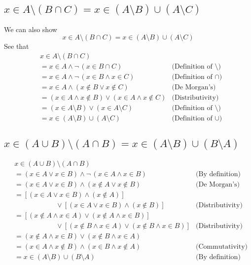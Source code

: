 \documentclass{report}
\begin{document}
\subsection{$x\in A\setminus(B\cap C)=x\in(A\setminus B)\cup(A\setminus C)$}
We can also show
\begin{equation*}
x\in A\setminus(B\cap C)=x\in(A\setminus B)\cup(A\setminus C)
\end{equation*}
See that
\begin{align*}
&x\in A\setminus(B\cap C)&\\
&=x\in A\land\neg\,(x\in B\cap C)&\text{(Definition of $\setminus$)}\\
&=x\in A\land\neg\,(x\in B\land x\in C)&\text{(Definition of $\cap$)}\\
&=x\in A\land(x\notin B\lor x\notin C)&\text{(De Morgan's)}\\
&=(x\in A\land x\notin B)\lor(x\in A\land x\notin C)&\text{(Distributivity)}\\
&=(x\in A\setminus B)\lor(x\in A\setminus C)&\text{(Definition of $\setminus$)}\\
&=x\in(A\setminus B)\cup(A\setminus C)&\text{(Definition of $\cup$)}
\end{align*}

\subsection{$x\in(A\cup B)\setminus(A\cap B)=x\in(A\setminus B)\cup(B\setminus A)$}
\begin{align*}
&x\in(A\cup B)\setminus(A\cap B)&\\
&=(x\in A\lor x\in B)\land\neg\,(x\in A\land x\in B)&(\text{By definition)}\\
&=(x\in A\lor x\in B)\land(x\notin A\lor x\notin B)&\text{(De Morgan's)}\\
&=[(x\in A\lor x\in B)\land(x\notin A)]&\\
&\qquad\qquad\qquad\lor[(x\in A\lor x\in B)\land(x\notin B)]&\text{(Distributivity)}\\
&=[(x\notin A\land x\in A)\lor(x\notin A\land x\in B)]&\\
&\qquad\qquad\qquad\lor[(x\notin B\land x\in A)\lor(x\notin B\land x\in B)]&\text{(Distributivity)}\\
&=(x\notin A\land x\in B)\lor(x\notin B\land x\in A)&\\
&=(x\in A\land x\notin B)\land(x\in B\land x\notin A)&\text{(Commutativity)}\\
&=x\in(A\setminus B)\cup(B\setminus A)&\text{(By definition)}
\end{align*}
\end{document}
